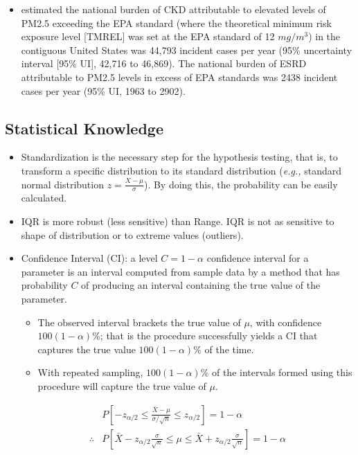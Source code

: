 \documentclass{article}
\begin{document}
\begin{itemize}
{\begin{itemize}
            \item \citet{bowe2018particulate} estimated the national burden of CKD attributable to elevated levels of PM2.5 exceeding the EPA standard (where the theoretical minimum risk exposure level [TMREL] was set at the EPA standard of 12 $mg/m^3$) in the contiguous United States was 44,793 incident cases per year (95\% uncertainty interval [95\% UI], 42,716 to 46,869). The national burden of ESRD attributable to PM2.5 levels in excess of EPA standards was 2438 incident cases per year (95\% UI, 1963 to 2902). 
        \end{itemize}
    }
\end{itemize}

\subsection{Statistical Knowledge}
\begin{itemize}
    \item Standardization is the necessary step for the hypothesis testing, that is, to transform a specific distribution to its standard distribution (\textit{e.g.,} standard normal distribution $z=\frac{X-\mu}{\sigma}$). By doing this, the probability can be easily calculated. 
    \item IQR is more robust (less sensitive) than Range. IQR is not as sensitive to shape of distribution or to extreme values (outliers).
    \item Confidence Interval (CI): a level $C=1-\alpha$ confidence interval for a parameter is an interval computed from sample data by a method that has probability $C$ of producing an interval containing the true value of the parameter.
        \begin{itemize}
            \item The observed interval brackets the true value of $\mu$, with confidence $100(1-\alpha)\%$; that is the procedure successfully yields a CI that captures the true value $100(1-\alpha)\%$ of the time. 
            \item With repeated sampling, $100(1-\alpha)\%$ of the intervals formed using this procedure will capture the true value of $\mu$.
        \end{itemize}
         \begin{align*}
                   &P[-z_{\alpha/2}\leq \frac{\bar{X}-\mu}{\sigma/\sqrt{n}}\leq z_{\alpha/2}]=1-\alpha \\
        \therefore &P[\bar{X}-z_{\alpha/2}\frac{\sigma}{\sqrt{n}}\leq \mu \leq \bar{X}+z_{\alpha/2}\frac{\sigma}{\sqrt{n}}]=1-\alpha
        \end{align*}
\end{itemize}



\end{document}
